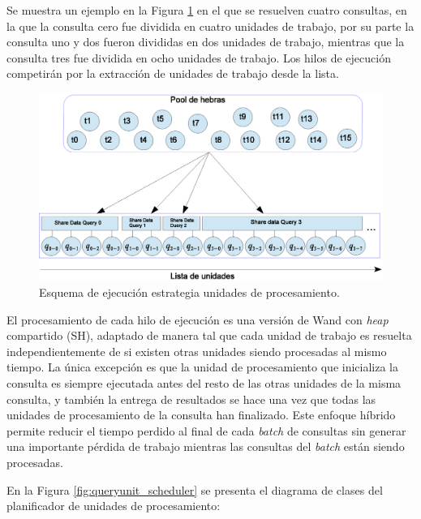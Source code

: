 Se muestra un ejemplo en la Figura \ref{fig:queryunit_execution} en el que se resuelven cuatro consultas, en la que la consulta cero fue dividida en cuatro unidades de trabajo, por su parte la consulta uno y dos fueron divididas en dos unidades de trabajo, mientras que la consulta tres fue dividida en ocho unidades de trabajo. Los hilos de ejecución competirán por la extracción de unidades de trabajo desde la lista.

\begin{figure}[!th]
\centering
\includegraphics[scale=.75]{images/QueryUnitExecution.eps}
\caption{Esquema de ejecución estrategia unidades de procesamiento.}
\label{fig:queryunit_execution}
\end{figure}

El procesamiento de cada hilo de ejecución es una versión de Wand con \textit{heap} compartido (SH), adaptado de manera tal que cada unidad de trabajo es resuelta independientemente de si existen otras unidades siendo procesadas al mismo tiempo. La única excepción es que la unidad de procesamiento que inicializa la consulta es siempre ejecutada antes del resto de las otras unidades de la misma consulta, y también la entrega de resultados se hace una vez que todas las unidades de procesamiento de la consulta han finalizado. Este enfoque híbrido permite reducir el tiempo perdido al final de cada \textit{batch} de consultas sin generar una importante pérdida de trabajo mientras las consultas del \textit{batch} están siendo procesadas.

En la Figura \ref{fig:queryunit_scheduler} se presenta el diagrama de clases del planificador de unidades de procesamiento:

